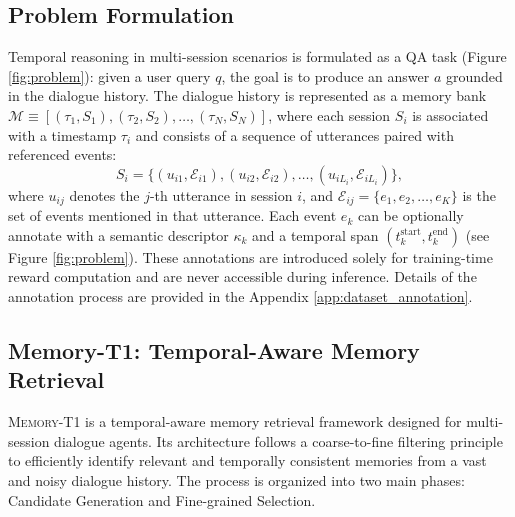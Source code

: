 \documentclass{article} %
\begin{document}
\subsection{Problem Formulation}
\label{sec:problem_formulation}
Temporal reasoning in multi-session scenarios is formulated as a QA task (Figure \ref{fig:problem}): given a user query $q$, the goal is to produce an answer $a$  grounded in the dialogue history. The dialogue history is represented as a memory bank 
$\mathcal{M} \equiv [(\tau_1,S_1), (\tau_2,S_2), \dots, (\tau_N,S_N)]$, 
where each session $S_i$ is associated with a timestamp $\tau_i$ and 
consists of a sequence of utterances paired with referenced events:
\begin{equation}
S_i=\{(u_{i1}, \mathcal{E}_{i1}), (u_{i2}, \mathcal{E}_{i2}), \dots, (u_{iL_i}, \mathcal{E}_{iL_i})\},
\end{equation}
where $u_{ij}$ denotes the $j$-th utterance in session $i$, and 
$\mathcal{E}_{ij} = \{ e_{1}, e_{2}, \dots, e_{K} \}$ 
is the set of events mentioned in that utterance.  
Each event $e_k$ can be optionally annotate with a semantic descriptor $\kappa_k$ 
and a temporal span $(t^{\text{start}}_k, t^{\text{end}}_k)$ (see Figure \ref{fig:problem}). These annotations are introduced solely for training-time reward computation and are never accessible during inference. Details of the annotation process are provided in the Appendix \ref{app:dataset_annotation}.  

\subsection{Memory-T1: Temporal-Aware Memory Retrieval}
\label{sec:memory-t1}

\textsc{Memory-T1} is a temporal-aware memory retrieval framework designed for multi-session dialogue agents. Its architecture follows a coarse-to-fine filtering principle to efficiently identify relevant and temporally consistent memories from a vast and noisy dialogue history. The process is organized into two main phases: Candidate Generation and Fine-grained Selection.
\end{document}
